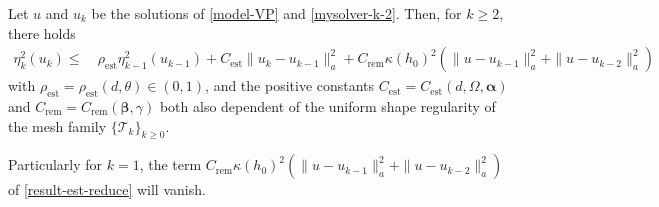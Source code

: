 \documentclass[10pt,a4paper]{amsart}
\newcommand{\anorm}[1]{\|#1\|_a}
\newcommand{\est}{\mathrm{est}}
\def\geq{\geqslant}
\newcommand{\mcT}{\mathcal{T}}
\newcommand{\rem}{\mathrm{rem}}
\newcommand{\valpha}{\boldsymbol{\alpha}}
\newcommand{\vbeta}{\boldsymbol{\beta}}
\begin{document}
\begin{lemma}\label{lem-est-reduce} 
	Let $u$ and $u_k$ be the solutions of \eqref{model-VP} and \eqref{mysolver-k-2}. Then, for $k \geq 2$, there holds
	\begin{align}
		\eta_k^2(u_k) \leqslant~& \rho_\est \eta_{k-1}^2(u_{k-1}) 
+ C_\est\anorm{u_k-u_{k-1}}^2+ C_\rem \kappa(h_0)^2\left(\anorm{u-u_{k-1}}^2 + \anorm{u-u_{k-2}}^2\right)
\label{result-est-reduce}
	\end{align}
with $\rho_\est = \rho_\est(d,\theta) \in (0,1)$, and the positive constants $C_\est = C_\est(d,\Omega,\valpha)$ and $C_\rem =  C_\rem(\vbeta,\gamma)$ both also dependent of the uniform shape regularity of the mesh family $\{\mcT_k\}_{k \geq 0}$. 

Particularly for $k = 1$, the term $C_\rem \kappa(h_0)^2(\anorm{u-u_{k-1}}^2 + \anorm{u-u_{k-2}}^2)$ of \eqref{result-est-reduce} will vanish. 
\end{lemma}
\end{document}
